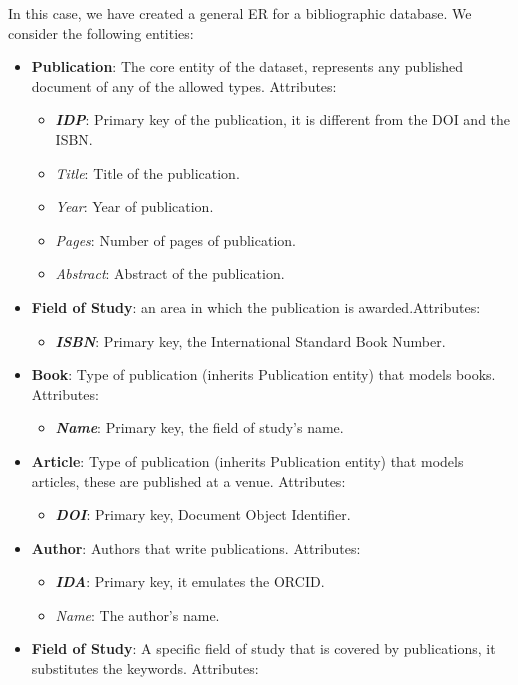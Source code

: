 \documentclass{Configuration_Files/PoliMi3i_thesis}
\begin{document}
In this case, we have created a general ER for a bibliographic database. We consider the following entities:
\begin{itemize}
\item \textbf{Publication}: The core entity of the dataset, represents any published document of any of the allowed types. Attributes:
\begin{itemize}
      \item \textit{\textbf{IDP}}: Primary key of the publication, it is different from the DOI and the ISBN.
      \item \textit{Title}: Title of the publication.
      \item \textit{Year}: Year of publication.
      \item \textit{Pages}: Number of pages of publication.
      \item \textit{Abstract}: Abstract of the publication.
    \end{itemize}
\item \textbf{Field of Study}:  an area in which the publication is awarded.Attributes:
\begin{itemize}
    \item \textit{\textbf{ISBN}}: Primary key, the International Standard Book Number.
\end{itemize}
\item \textbf{Book}: Type of publication (inherits Publication entity) that models books. Attributes:
\begin{itemize}
    \item \textit{\textbf{Name}}: Primary key, the field of study's name.
\end{itemize}
\item \textbf{Article}: Type of publication (inherits Publication entity) that models articles, these are published at a venue. Attributes:
\begin{itemize}
    \item \textit{\textbf{DOI}}: Primary key, Document Object Identifier.
\end{itemize}
\item \textbf{Author}: Authors that write publications. Attributes:
\begin{itemize}
      \item \textit{\textbf{IDA}}: Primary key, it emulates the ORCID.
      \item \textit{Name}: The author's name.
    \end{itemize}
\item \textbf{Field of Study}: A specific field of study that is covered by publications, it substitutes the keywords. Attributes:

\end{itemize}
\end{document}
